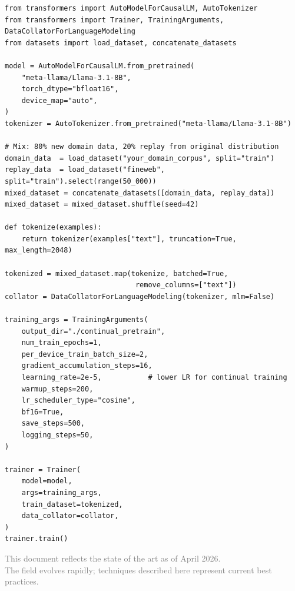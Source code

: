 \begin{lstlisting}[style=pythonstyle, caption={Continual pre-training with replay to prevent forgetting}]
from transformers import AutoModelForCausalLM, AutoTokenizer
from transformers import Trainer, TrainingArguments, DataCollatorForLanguageModeling
from datasets import load_dataset, concatenate_datasets

model = AutoModelForCausalLM.from_pretrained(
    "meta-llama/Llama-3.1-8B",
    torch_dtype="bfloat16",
    device_map="auto",
)
tokenizer = AutoTokenizer.from_pretrained("meta-llama/Llama-3.1-8B")

# Mix: 80% new domain data, 20% replay from original distribution
domain_data  = load_dataset("your_domain_corpus", split="train")
replay_data  = load_dataset("fineweb", split="train").select(range(50_000))
mixed_dataset = concatenate_datasets([domain_data, replay_data])
mixed_dataset = mixed_dataset.shuffle(seed=42)

def tokenize(examples):
    return tokenizer(examples["text"], truncation=True, max_length=2048)

tokenized = mixed_dataset.map(tokenize, batched=True,
                               remove_columns=["text"])
collator = DataCollatorForLanguageModeling(tokenizer, mlm=False)

training_args = TrainingArguments(
    output_dir="./continual_pretrain",
    num_train_epochs=1,
    per_device_train_batch_size=2,
    gradient_accumulation_steps=16,
    learning_rate=2e-5,           # lower LR for continual training
    warmup_steps=200,
    lr_scheduler_type="cosine",
    bf16=True,
    save_steps=500,
    logging_steps=50,
)

trainer = Trainer(
    model=model,
    args=training_args,
    train_dataset=tokenized,
    data_collator=collator,
)
trainer.train()
\end{lstlisting}

\vfill
\begin{center}
\textcolor{gray}{\small This document reflects the state of the art as of April 2026.\\The field evolves rapidly; techniques described here represent current best practices.}
\end{center}
